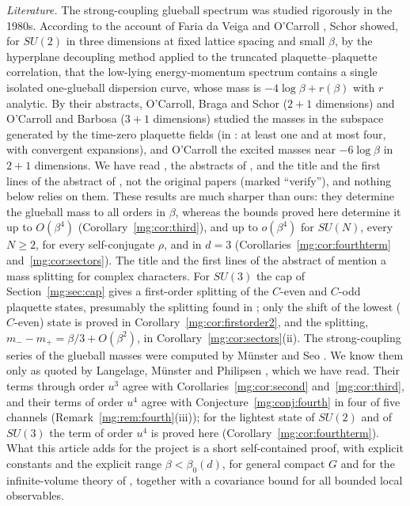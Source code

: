 \documentclass[11pt,a4paper]{article}
\theoremstyle{definition}
\theoremstyle{remark}
\begin{document}
\emph{Literature.} The strong-coupling glueball spectrum was studied rigorously in the 1980s. According to the account of
Faria da Veiga and O'Carroll \cite[Sections~II and~V]{FO25}, Schor \cite{Sch83,Sch84a,Sch84b} showed, for $SU(2)$ in three
dimensions at fixed lattice spacing and small $\beta$, by the hyperplane decoupling method applied to the truncated
plaquette--plaquette correlation, that the low-lying energy-momentum spectrum contains a single isolated one-glueball dispersion
curve, whose mass is $-4\log\beta+r(\beta)$ with $r$ analytic. By their abstracts, O'Carroll, Braga and Schor \cite{OBS85} ($2+1$
dimensions) and O'Carroll and Barbosa \cite{OB85} ($3+1$ dimensions) studied the masses in the subspace generated by the time-zero
plaquette fields (in \cite{OB85}: at least one and at most four, with convergent expansions), and O'Carroll \cite{OC85} the excited
masses near $-6\log\beta$ in $2+1$ dimensions. We have read \cite{FO25}, the abstracts of \cite{OB85,OC85}, and the title and the first lines of the abstract of
\cite{OBS85}, not the original papers (marked ``verify''), and nothing below relies on them. These results are much sharper than ours: they determine the glueball
mass to all orders in $\beta$, whereas the bounds proved here determine it up to $O(\beta^4)$ (Corollary~\ref{mg:cor:third}), and up to $o(\beta^4)$ for
$SU(N)$, every $N\ge2$, for every self-conjugate $\rho$, and in $d=3$ (Corollaries~\ref{mg:cor:fourthterm} and~\ref{mg:cor:sectors}). The title and the
first lines of the abstract of \cite{OBS85} mention a mass splitting for complex characters. For $SU(3)$ the cap of Section~\ref{mg:sec:cap} gives a
first-order splitting of the $C$-even and $C$-odd plaquette states, presumably the splitting found in \cite{OBS85}; only the shift of the lowest
($C$-even) state is proved in Corollary~\ref{mg:cor:firstorder2}, and the splitting, $m_--m_+=\beta/3+O(\beta^2)$, in Corollary~\ref{mg:cor:sectors}(ii).
The strong-coupling series of the glueball masses were computed by Münster \cite{Mun81} and Seo \cite{Seo82}. We know them only as quoted by Langelage,
Münster and Philipsen \cite{LMP07,LMP08}, which we have read. Their terms through order $u^3$ agree with Corollaries~\ref{mg:cor:second}
and~\ref{mg:cor:third}, and their terms of order $u^4$ agree with Conjecture~\ref{mg:conj:fourth} in four of five channels
(Remark~\ref{mg:rem:fourth}(iii)); for the lightest state of $SU(2)$ and of $SU(3)$ the term of order $u^4$ is proved here (Corollary~\ref{mg:cor:fourthterm}).
What this article adds for the project is a short self-contained proof, with explicit constants and the explicit range
$\beta<\beta_0(d)$, for general compact $G$ and for the infinite-volume theory of \cite{II}, together with a covariance bound for all
bounded local observables.
\end{document}
